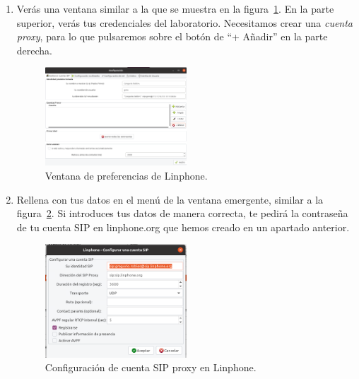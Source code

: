 \documentclass[11pt,a4paper]{article}
\begin{document}
\begin{enumerate}
  \item Verás una ventana similar a la que se muestra en la figura~\ref{fig:preferencias}. En la parte superior, verás tus credenciales del laboratorio. Necesitamos crear una \emph{cuenta proxy}, para lo que pulsaremos sobre el botón de ``+ Añadir'' en la parte derecha.

\begin{center}
\begin{figure}[h!]
\center
\includegraphics[width=0.5\textwidth]{figs/preferencias.png}
\caption{Ventana de preferencias de Linphone.}
\label{fig:preferencias}
\end{figure}
\end{center}
  
   \item Rellena con tus datos en el menú de la ventana emergente, similar a la figura~\ref{fig:configuracion}. Si introduces tus datos de manera correcta, te pedirá la contraseña de tu cuenta SIP en linphone.org que hemos creado en un apartado anterior.

\begin{center}
\begin{figure}[h!]
\center
\includegraphics[width=0.5\textwidth]{figs/configuracion.png}
\caption{Configuración de cuenta SIP proxy en Linphone.}
\label{fig:configuracion}
\end{figure}
\end{center}


\end{enumerate}
\end{document}
